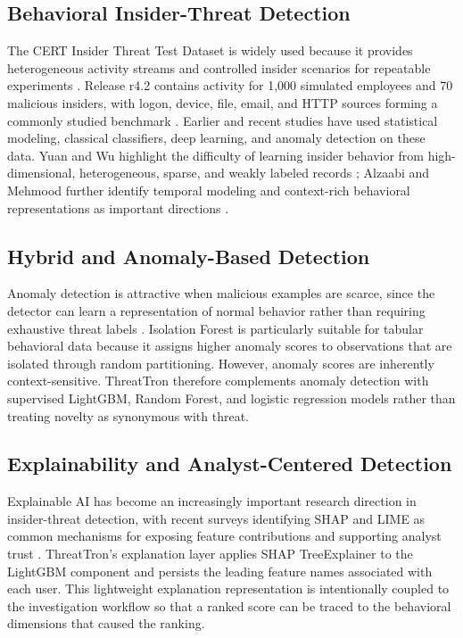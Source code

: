 \subsection{Behavioral Insider-Threat Detection}
The CERT Insider Threat Test Dataset is widely used because it provides heterogeneous activity streams and controlled insider scenarios for repeatable experiments \cite{cert2020}. Release r4.2 contains activity for 1,000 simulated employees and 70 malicious insiders, with logon, device, file, email, and HTTP sources forming a commonly studied benchmark \cite{cert2020}. Earlier and recent studies have used statistical modeling, classical classifiers, deep learning, and anomaly detection on these data. Yuan and Wu highlight the difficulty of learning insider behavior from high-dimensional, heterogeneous, sparse, and weakly labeled records \cite{yuan2021}; Alzaabi and Mehmood further identify temporal modeling and context-rich behavioral representations as important directions \cite{alzaabi2024}.

\subsection{Hybrid and Anomaly-Based Detection}
Anomaly detection is attractive when malicious examples are scarce, since the detector can learn a representation of normal behavior rather than requiring exhaustive threat labels \cite{chandola2009}. Isolation Forest is particularly suitable for tabular behavioral data because it assigns higher anomaly scores to observations that are isolated through random partitioning. However, anomaly scores are inherently context-sensitive. ThreatTron therefore complements anomaly detection with supervised LightGBM, Random Forest, and logistic regression models rather than treating novelty as synonymous with threat.

\subsection{Explainability and Analyst-Centered Detection}
Explainable AI has become an increasingly important research direction in insider-threat detection, with recent surveys identifying SHAP and LIME as common mechanisms for exposing feature contributions and supporting analyst trust \cite{alketbi2025}. ThreatTron's explanation layer applies SHAP TreeExplainer to the LightGBM component and persists the leading feature names associated with each user. This lightweight explanation representation is intentionally coupled to the investigation workflow so that a ranked score can be traced to the behavioral dimensions that caused the ranking.

